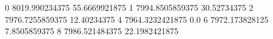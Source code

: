 0 8019.990234375 55.6669921875
1 7994.8505859375 30.52734375
2 7976.7255859375 12.40234375
4 7964.3232421875 0.0
6 7972.173828125 7.8505859375
8 7986.521484375 22.1982421875
